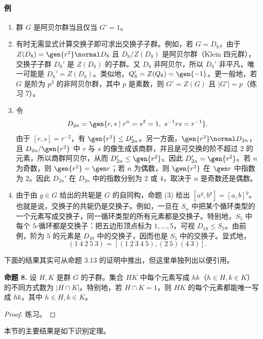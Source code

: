 \paragraph{例}
\begin{enumerate}[label=(\arabic*)]
  \item 群 $G$ 是阿贝尔群当且仅当 $G'=1$。

  \item 有时无需显式计算交换子即可求出交换子子群。例如，若 $G=D_8$，由于 $Z(D_8)=\gen{r^2}\normal D_8$ 且 $D_8/Z(D_8)$ 是阿贝尔群（Klein 四元群），交换子子群 $D_8'$ 是 $Z(D_8)$ 的子群。又 $D_8$ 非阿贝尔，所以 $D_8'$ 非平凡，唯一可能是 $D_8'=Z(D_8)$。类似地，$Q_8'=Z(Q_8)=\gen{-1}$。更一般地，若 $G$ 是阶为 $p^3$ 的非阿贝尔群，其中 $p$ 是素数，则 $G'=Z(G)$ 且 $|G'|=p$（练习 7）。

  \item 令
  \[
    D_{2n}=\gen{r,s\mid r^n=s^2=1,
\ s^{-1}rs=r^{-1}}.
  \]
  由于 $[r,s]=r^{-2}$，有 $\gen{r^2}\leq D_{2n}'$。另一方面，$\gen{r^2}\normal D_{2n}$，且 $D_{2n}/\gen{r^2}$ 中 $r$ 与 $s$ 的像生成该商群，并且是可交换的阶不超过 $2$ 的元素，所以商群阿贝尔，从而 $D_{2n}'\leq\gen{r^2}$。因此 $D_{2n}'=\gen{r^2}$。若 $n$ 为奇数，则 $\gen{r^2}=\gen r$；若 $n$ 为偶数，则 $\gen{r^2}$ 在 $\gen r$ 中指数为 $2$。因此 $D_{2n}'$ 在 $D_{2n}$ 中的指数分别为 $2$ 或 $4$，取决于 $n$ 是奇数还是偶数。

  \item 由于由 $g\in G$ 给出的共轭是 $G$ 的自同构，命题 (3) 给出 $[a^g,b^g]=[a,b]^g$。也就是说，交换子的共轭仍是交换子。例如，一旦在 $S_n$ 中把某个循环类型的一个元素写成交换子，同一循环类型的所有元素都是交换子。特别地，$S_5$ 中每个 $5$-循环都是交换子：把五边形顶点标为 $1,
\ldots,5$，可视 $D_{10}\leq S_5$。由前例，阶为 $5$ 的元素是 $D_{10}$ 中的交换子，因而也是 $S_5$ 中的交换子。显式地，
  \[
    (1
\ 4
\ 2
\ 5
\ 3)=[(1
\ 2
\ 3
\ 4
\ 5),(2
\ 5)(4
\ 3)].
  \]
\end{enumerate}

下面的结果其实可从命题 3.13 的证明中推出，但这里单独列出以便引用。

\medskip
\noindent\textbf{命题 8.} 设 $H,K$ 是群 $G$ 的子群。集合 $HK$ 中每个元素写成 $hk$（$h\in H,k\in K$）的不同方式数为 $|H\cap K|$。特别地，若 $H\cap K=1$，则 $HK$ 的每个元素都能唯一写成 $hk$，其中 $h\in H,k\in K$。

\begin{proof}
练习。
\end{proof}

本节的主要结果是如下识别定理。

